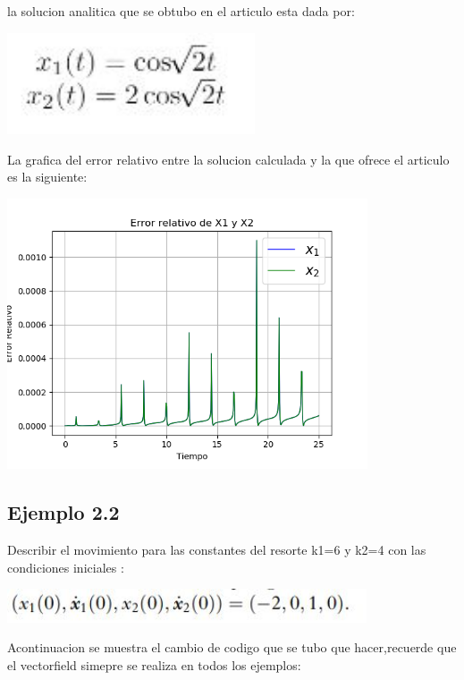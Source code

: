 \documentclass{article}
\begin{document}
la solucion analitica que se obtubo en el articulo esta dada por:

\begin{center}
\includegraphics[height=3cm]{ec9.png}
\end{center}

La grafica del error relativo entre la solucion calculada y la que ofrece el articulo es la siguiente:


\begin{center}
\includegraphics[height=8cm]{ErrorRelativo2_1.png}
\end{center}

\subsection{Ejemplo 2.2}

Describir el movimiento para las constantes del resorte k1=6 y k2=4 con las condiciones iniciales :

\begin{center}
\includegraphics[height=1cm]{ec10.png}
\end{center}

Acontinuacion se muestra el cambio de codigo que se tubo que hacer,recuerde que el vectorfield simepre se realiza en todos los ejemplos:
\end{document}
